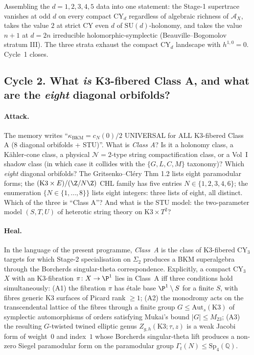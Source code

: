 Assembling the $d = 1, 2, 3, 4, 5$ data into one statement: the
Stage-1 supertrace vanishes at odd $d$ on every compact CY$_d$
regardless of algebraic richness of $\mathcal{A}_X$, takes the
value $2$ at strict CY even $d$ of $\mathrm{SU}(d)$-holonomy, and
takes the value $n + 1$ at $d = 2n$ irreducible
holomorphic-symplectic (Beauville--Bogomolov stratum III). The
three strata exhaust the compact CY$_d$ landscape with
$h^{1, 0} = 0$. Cycle~1 closes.

\subsection*{Cycle 2. What \emph{is} K3-fibered Class A, and what
  are the \emph{eight} diagonal orbifolds?}

\paragraph{Attack.} The memory writes ``$\kappa_{\mathrm{BKM}} =
c_N(0)/2$ UNIVERSAL for ALL K3-fibered Class A (8 diagonal
orbifolds + STU)''. What is \emph{Class A}? Is it a holonomy class,
a K\"ahler-cone class, a physical $\mathcal{N} = 2$-type string
compactification class, or a Vol~I shadow class (in which case it
collides with the $\{G, L, C, M\}$ taxonomy)? Which \emph{eight}
diagonal orbifolds? The Gritsenko--Cl\'ery Thm 1.2 lists eight
paramodular forms; the $(\mathrm{K3} \times E)/(\Z/N\Z)$ CHL
family has five entries $N \in \{1, 2, 3, 4, 6\}$; the enumeration
$\{N \in \{1, \ldots, 8\}\}$ lists eight integers: three lists of
eight, all distinct. Which of the three is ``Class A''? And
what is the STU model: the two-parameter model
$(S, T, U)$ of heterotic string theory on $\mathrm{K3} \times T^2$?

\paragraph{Heal.} In the language of the present programme,
\emph{Class~A} is the class of K3-fibered CY$_3$ targets for which
Stage-2 specialisation on $\Sigma_2$ produces a BKM superalgebra
through the Borcherds singular-theta correspondence. Explicitly,
a compact CY$_3$ $X$ with an $\mathrm{K3}$-fibration $\pi \colon X
\to \P^1$ lies in Class~A iff three conditions hold simultaneously:
(A1) the fibration $\pi$ has \'etale base $\P^1 \setminus S$ for
a finite $S$, with fibres generic K3 surfaces of Picard rank
$\geq 1$; (A2) the monodromy acts on the transcendental lattice of
the fibres through a finite group $G \leq \mathrm{Aut}_s(\mathrm{K3})$
of symplectic automorphisms of orders satisfying Mukai's bound
$|G| \leq M_{23}$; (A3) the resulting $G$-twisted twined elliptic
genus $Z_{g, h}(\mathrm{K3}; \tau, z)$ is a weak Jacobi form of
weight~$0$ and index~$1$ whose Borcherds singular-theta lift
produces a non-zero Siegel paramodular form on the paramodular
group $\Gamma_t(N) \leq \mathrm{Sp}_4(\mathbb{Q})$.

